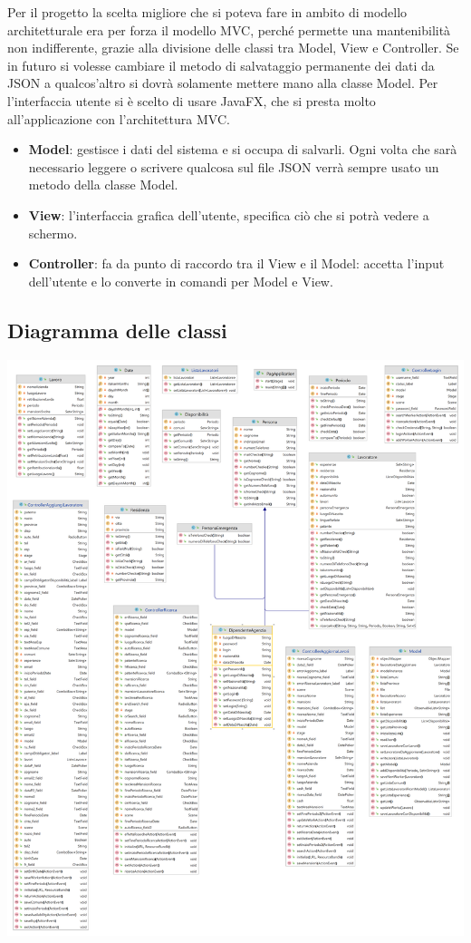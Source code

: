 \documentclass{article}
\begin{document}
    Per il progetto la scelta migliore che si poteva fare in ambito di modello architetturale era per forza il modello MVC, perché permette una mantenibilità non indifferente, grazie alla divisione delle classi tra Model, View e Controller. Se in futuro si volesse cambiare il metodo di salvataggio permanente dei dati da JSON a qualcos'altro si dovrà solamente mettere mano alla classe Model. Per l'interfaccia utente si è scelto di usare JavaFX, che si presta molto all'applicazione con l'architettura MVC.
    \begin{itemize}
        \item[] \textbf{Model}: gestisce i dati del sistema e si occupa di salvarli. Ogni volta che sarà necessario leggere o scrivere qualcosa sul file JSON verrà sempre usato un metodo della classe Model.
        \item[] \textbf{View}: l'interfaccia grafica dell'utente, specifica ciò che si potrà vedere a schermo.
        \item[] \textbf{Controller}: fa da punto di raccordo tra il View e il Model: accetta l’input dell’utente e lo converte in comandi per Model e View.
    \end{itemize}

    \subsection{Diagramma delle classi}

    \includegraphics[width=\linewidth]{DipendenteAgenzia.png}
\end{document}
